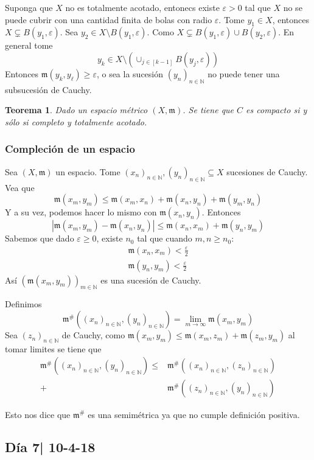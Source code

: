 \documentclass[12pt]{article}
\theoremstyle{plain}
\newtheorem{Th}{Teorema}[subsection]   %
\theoremstyle{definition}
\theoremstyle{remark}
\numberwithin{equation}{section}
\newcommand{\bN}{\mathbb{N}}        %
\newcommand{\mm}{\mathfrak{m}}      %
\renewcommand{\geq}{\geqslant}      %
\renewcommand{\leq}{\leqslant}      %
\renewcommand{\:}{\colon}           %
\newcommand{\bonj}[1]{\left\lbrack#1\right\rbrack}
\begin{document}
\begin{multicols}{2}
\begin{ptcbp}
Suponga que $X$ no es totalmente acotado, entonecs existe $\varepsilon >0$ tal que $X$ no se puede cubrir con una cantidad finita de bolas con radio $\varepsilon$. Tome $y_1\in X$, entonces $X\subsetneq B(y_1,\varepsilon)$. Sea $y_2\in X\setminus B(y_1,\varepsilon)$. Como $X\subsetneq B(y_1,\varepsilon)\cup B(y_2,\varepsilon)$. En general tome
$$y_k\in X\setminus\left(\cup_{j\in\bonj{k-1}}B(y_j,\varepsilon)\right)$$
Entonces $\mm(y_k,y_\ell)\geq\varepsilon$, o sea la sucesión $(y_n)_{n\in\bN}$ no puede tener una subsucesión de Cauchy.
\end{ptcbp}

\begin{Th}
  Dado un espacio métrico $(X,\mm)$. Se tiene que $C$ es compacto si y sólo si completo y totalmente acotado.
\end{Th}

\subsubsection*{Compleción de un espacio}

Sea $(X,\mm)$ un espacio. Tome $(x_n)_{n\in\bN},(y_n)_{n\in\bN}\subseteq X$ sucesiones de Cauchy. Vea que
$$\mm(x_m,y_m)\leq \mm(x_m,x_n)+\mm(x_n,y_n)+\mm(y_m,y_n)$$
Y a su vez, podemos hacer lo mismo con $\mm(x_n,y_n)$. Entonces
$$|\mm(x_m,y_m)-\mm(x_n,y_n)|\leq \mm(x_n,x_m)+\mm(y_n,y_m)$$
Sabemos que dado $\varepsilon\geq 0$, existe $n_0$ tal que cuando $m,n\geq n_0$:
\begin{gather*}
  \mm(x_n,x_m)<\frac{\varepsilon}{2} \\
  \mm(y_n,y_m)<\frac{\varepsilon}{2}
\end{gather*}
Así $(\mm(x_m,y_m))_{m\in\bN}$ es una sucesión de Cauchy.\par
Definimos
$$\mm^\#((x_n)_{n\in\bN},(y_n)_{n\in\bN})=\lim_{m\to\infty}\mm(x_m,y_m)$$
Sea $(z_n)_{n\in\bN}$ de Cauchy, como $\mm(x_m,y_m)\leq \mm(x_m,z_m)+\mm(z_m,y_m)$ al tomar limites se tiene que
\begin{align*}
  \mm^\#((x_n)_{n\in\bN},(y_n)_{n\in\bN})\leq  & \mm^\#((x_n)_{n\in\bN},(z_n)_{n\in\bN}) \\
   +&\mm^\#((z_n)_{n\in\bN},(y_n)_{n\in\bN})
\end{align*}

Esto nos dice que $\mm^\#$ es una semimétrica ya que no cumple definición positiva.

\subsection{Día 7| 10-4-18}


\end{multicols}
\end{document}
